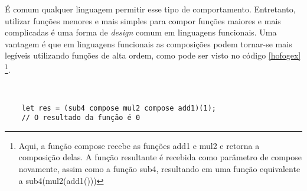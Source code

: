 É comum qualquer linguagem permitir esse tipo 
de comportamento. Entretanto, 
utilizar funções menores e mais simples para compor 
funções maiores e mais complicadas é uma forma de 
\textit{design} comum em linguagens funcionais. Uma vantagem é 
que em linguagens funcionais as composições podem 
tornar-se mais legíveis utilizando funções 
de alta ordem, como pode ser visto no código 
\ref{hofogex} \footnote{Aqui, a função compose 
recebe as funções add1 e mul2 e retorna a 
composição delas. A função resultante 
é recebida como parâmetro de compose novamente, 
assim como a função sub4, resultando em uma função 
equivalente a sub4(mul2(add1()))}.

\begin{lstlisting}[caption={Exemplo de Composição de Funções},label=hofogex]


    let res = (sub4 compose mul2 compose add1)(1);
    // O resultado da função é 0

\end{lstlisting}
